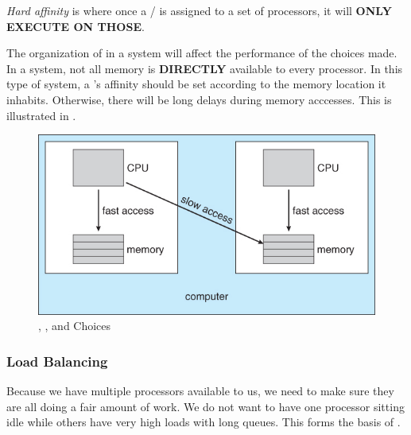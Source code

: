 \begin{definition}\label{def:Hard_Affinity}
  \emph{Hard affinity} is where once a / is assigned to a set of processors, it will \textbf{ONLY EXECUTE ON THOSE}.
\end{definition}

The organization of  in a system will affect the performance of the  choices made.
In a  system, not all memory is \textbf{DIRECTLY} available to every processor.
In this type of system, a 's affinity should be set according to the memory location it inhabits.
Otherwise, there will be long delays during memory acccesses.
This is illustrated in .

\begin{figure}[h!tbp]
  \centering
  \includegraphics[scale=1.00]{./Drawings/EDAF35-Operating_Systems/NUMA_Multiprocessor_Scheduling.jpg}
  \caption{, , and  Choices}
  \label{fig:NUMA_Multiprocessor_Scheduling}
\end{figure}

\subsubsection{Load Balancing}\label{subsubsec:Load_Balancing}
Because we have multiple processors available to us, we need to make sure they are all doing a fair amount of work.
We do not want to have one processor sitting idle while others have very high loads with long queues.
This forms the basis of .

